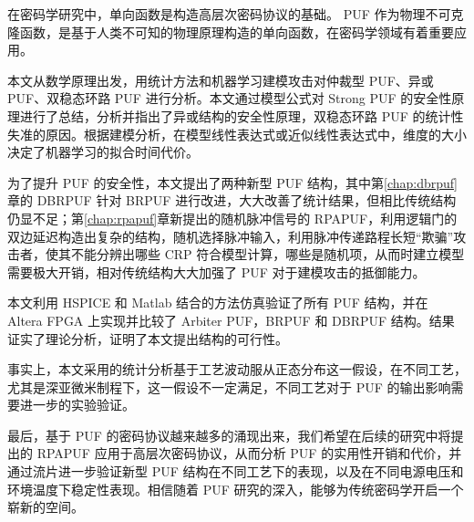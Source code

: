 
\label{chap:conclusion}

在密码学研究中，单向函数是构造高层次密码协议的基础。 PUF 作为物理不可克隆函数，是基于人类不可知的物理原理构造的单向函数，在密码学领域有着重要应用。

本文从数学原理出发，用统计方法和机器学习建模攻击对仲裁型 PUF、异或 PUF、双稳态环路 PUF 进行分析。本文通过模型公式对 Strong PUF 的安全性原理进行了总结，分析并指出了异或结构的安全性原理，双稳态环路 PUF 的统计性失准的原因。根据建模分析，在模型线性表达式或近似线性表达式中，维度的大小决定了机器学习的拟合时间代价。

为了提升 PUF 的安全性，本文提出了两种新型 PUF 结构，其中第\ref{chap:dbrpuf}章的 DBRPUF 针对 BRPUF 进行改进，大大改善了统计结果，但相比传统结构仍显不足；第\ref{chap:rpapuf}章新提出的随机脉冲信号的 RPAPUF，利用逻辑门的双边延迟构造出复杂的结构，随机选择脉冲输入，利用脉冲传递路程长短``欺骗''攻击者，使其不能分辨出哪些 CRP 符合模型计算，哪些是随机项，从而时建立模型需要极大开销，相对传统结构大大加强了 PUF 对于建模攻击的抵御能力。

本文利用 HSPICE 和 Matlab 结合的方法仿真验证了所有 PUF 结构，并在 Altera FPGA 上实现并比较了 Arbiter PUF，BRPUF 和 DBRPUF 结构。结果证实了理论分析，证明了本文提出结构的可行性。

事实上，本文采用的统计分析基于工艺波动服从正态分布这一假设，在不同工艺，尤其是深亚微米制程下，这一假设不一定满足，不同工艺对于 PUF 的输出影响需要进一步的实验验证。

最后，基于 PUF 的密码协议越来越多的涌现出来，我们希望在后续的研究中将提出的 RPAPUF 应用于高层次密码协议，从而分析 PUF 的实用性开销和代价，并通过流片进一步验证新型 PUF 结构在不同工艺下的表现，以及在不同电源电压和环境温度下稳定性表现。相信随着 PUF 研究的深入，能够为传统密码学开启一个崭新的空间。



